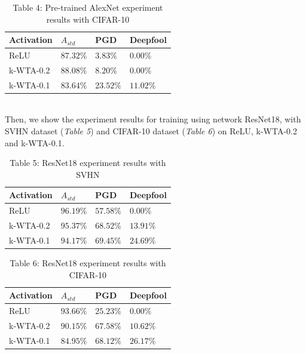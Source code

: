 \documentclass[a4paper]{article}
\begin{document}
	\begin{table}[!htbp]
		\begin{tabular}{|p{}|p{}|p{}|p{}|}
			\hline
			Activation	& $A_{std}$	&	PGD	&	Deepfool	\\
			\hline
			ReLU		&$87.32\%$&$3.83\%$&$0.00\%$	\\
			\hline
			k-WTA-0.2	&$88.08\%$&$8.20\%$&$0.00\%$	\\
			\hline
			k-WTA-0.1	&$83.64\%$&$23.52\%$&$11.02\%$	\\
			\hline
		\end{tabular}
		\caption{Table 4: Pre-trained AlexNet experiment results with CIFAR-10}\label{pre-alexnetCIFAR10}
	\end{table}\\
	Then, we show the experiment results for training using network ResNet18, with SVHN dataset (\textit{Table 5}) and CIFAR-10 dataset (\textit{Table 6}) on ReLU, k-WTA-0.2 and k-WTA-0.1.
	\begin{table}[!htbp]
		\begin{tabular}{|p{}|p{}|p{}|p{}|}
			\hline
			Activation	& $A_{std}$	&	PGD	&	Deepfool	\\
			\hline
			ReLU		&$96.19\%$&$57.58\%$&$0.00\%$	\\
			\hline
			k-WTA-0.2	&$95.37\%$&$68.52\%$&$13.91\%$	\\
			\hline
			k-WTA-0.1	&$94.17\%$&$69.45\%$&$24.69\%$	\\
			\hline
		\end{tabular}
		\caption{Table 5: ResNet18 experiment results with SVHN}\label{resnetSVHN}
	\end{table}
	\begin{table}[!htbp]
		\begin{tabular}{|p{}|p{}|p{}|p{}|}
			\hline
			Activation	& $A_{std}$	&	PGD	&	Deepfool	\\
			\hline
			ReLU		&$93.66\%$&$25.23\%$&$0.00\%$	\\
			\hline
			k-WTA-0.2	&$90.15\%$&$67.58\%$&$10.62\%$	\\
			\hline
			k-WTA-0.1	&$84.95\%$&$68.12\%$&$26.17\%$	\\
			\hline
		\end{tabular}
		\caption{Table 6: ResNet18 experiment results with CIFAR-10}\label{resnetCIFAR10}
	\end{table}\\
\end{document}
